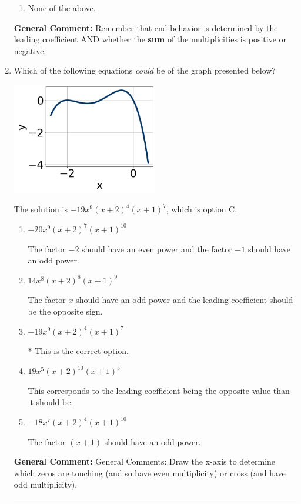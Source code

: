 \documentclass{extbook}[14pt]
\newcommand{\litem}[1]{\item #1

\rule{\textwidth}{0.4pt}}
\begin{document}
\begin{enumerate}
{\begin{enumerate}[label=\Alph*.]
\begin{multicols}{2}
\end{multicols}\item None of the above.\end{enumerate}
\textbf{General Comment:} Remember that end behavior is determined by the leading coefficient AND whether the \textbf{sum} of the multiplicities is positive or negative.
}
\litem{
Which of the following equations \textit{could} be of the graph presented below?

\begin{center}
    \includegraphics[width=0.5\textwidth]{../Figures/polyGraphToFunctionB.png}
\end{center}


The solution is \( -19x^{9} (x + 2)^{4} (x + 1)^{7} \), which is option C.\begin{enumerate}[label=\Alph*.]
\item \( -20x^{9} (x + 2)^{7} (x + 1)^{10} \)

The factor $-2$ should have an even power and the factor $-1$ should have an odd power.
\item \( 14x^{8} (x + 2)^{8} (x + 1)^{9} \)

The factor $x$ should have an odd power and the leading coefficient should be the opposite sign.
\item \( -19x^{9} (x + 2)^{4} (x + 1)^{7} \)

* This is the correct option.
\item \( 19x^{5} (x + 2)^{10} (x + 1)^{5} \)

This corresponds to the leading coefficient being the opposite value than it should be.
\item \( -18x^{7} (x + 2)^{4} (x + 1)^{10} \)

The factor $(x + 1)$ should have an odd power.
\end{enumerate}

\textbf{General Comment:} General Comments: Draw the x-axis to determine which zeros are touching (and so have even multiplicity) or cross (and have odd multiplicity).
}
\end{enumerate}
\end{document}
